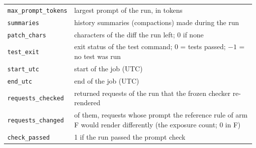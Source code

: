 \begin{table}[!htb]
\begin{tabular}{lp{11.4cm}}
\texttt{max\_prompt\_tokens} & largest prompt of the run, in tokens \\
\texttt{summaries} & history summaries (compactions) made during the run \\
\texttt{patch\_chars} & characters of the diff the run left; 0 if none \\
\texttt{test\_exit} & exit status of the test command; 0 = tests passed; $-1$ = no test was run \\
\texttt{start\_utc} & start of the job (UTC) \\
\texttt{end\_utc} & end of the job (UTC) \\
\texttt{requests\_checked} & returned requests of the run that the frozen checker re-rendered \\
\texttt{requests\_changed} & of them, requests whose prompt the reference rule of arm F would render differently (the exposure count; 0 in F) \\
\texttt{check\_passed} & 1 if the run passed the prompt check \\
\bottomrule
\end{tabular}
\end{table}

